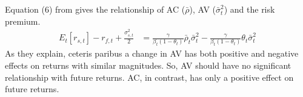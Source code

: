 %
%
%

Equation (6) from \citet{pollet_average_2010} gives the relationship of AC ($\bar{\rho}$), AV ($\bar{\sigma}^{2}_{t}$) and the risk premium.
\begin{align*}
	E_{t}[r_{s,t}] - r_{f,t} + \frac{\sigma^{2}_{s,t}}{2} &= \frac{\gamma}{\beta_{t}(1-\theta_{t})}\bar{\rho}_{t}\bar{\sigma}^{2}_{t} - \frac{\gamma}{\beta_{t}(1-\theta_{t})}\theta_{t}\bar{\sigma}^{2}_{t}
\end{align*}
As they explain, ceteris paribus a change in AV has both positive and negative effects on returns with similar magnitudes. So, AV should have no significant relationship with future returns. AC, in contrast, has only a positive effect on future returns.


